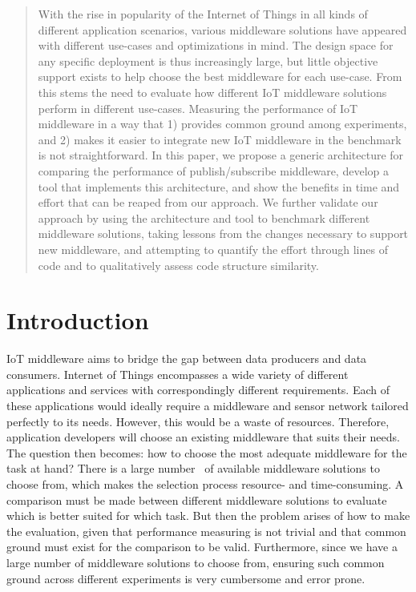 \documentclass[conference]{IEEEtran}
\begin{document}
\begin{abstract}
  With the rise in popularity of the Internet of Things in all kinds of different application scenarios, various middleware solutions have appeared with different use-cases and optimizations in mind. The design space for any specific deployment is thus increasingly large, but little objective support exists to help choose the best middleware for each use-case. From this stems the need to evaluate how different IoT middleware solutions perform in different use-cases. Measuring the performance of IoT middleware in a way that 1) provides common ground among experiments, and 2) makes it easier to integrate new IoT middleware in the benchmark is not straightforward. In this paper, we propose a generic architecture for comparing the performance of publish/subscribe middleware, develop a tool that implements this architecture, and show the benefits in time and effort that can be reaped from our approach. We further validate our approach by using the architecture and tool to benchmark different middleware solutions, taking lessons from the changes necessary to support new middleware, and attempting to quantify the effort through lines of code and to qualitatively assess code structure similarity. 
\end{abstract}

\section{Introduction}

IoT middleware aims to bridge the gap between data producers and data consumers. Internet of Things encompasses a wide variety of different applications and services with correspondingly different requirements. Each of these applications would ideally require a middleware and sensor network tailored perfectly to its needs. However, this would be a waste of resources. Therefore, application developers will choose an existing middleware that suits their needs. The question then becomes: how to choose the most adequate middleware for the task at hand? There is a large number~\cite{razzaque_middleware_2016} of available middleware solutions to choose from, which makes the selection process resource- and time-consuming. A comparison must be made between different middleware solutions to evaluate which is better suited for which task. But then the problem arises of how to make the evaluation, given that performance measuring is not trivial and that common ground must exist for the comparison to be valid. Furthermore, since we have a large number of middleware solutions to choose from, ensuring such common ground across different experiments is very cumbersome and error prone. 
\end{document}
